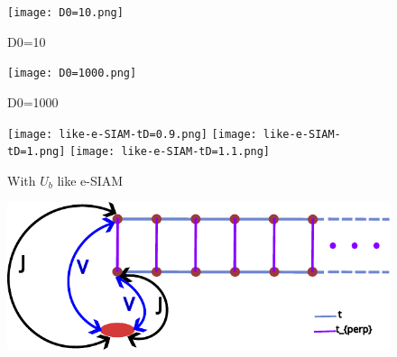 \documentclass[12pt]{article}
\begin{document}
\begin{figure}[!ht]
    \centering
    \texttt{[image: D0=10.png]}
    \caption{D0=10}
\end{figure}

\begin{figure}[!ht]
    \centering
    \texttt{[image: D0=1000.png]}
    \caption{D0=1000}
\end{figure}

\newpage



\begin{figure}[!ht]
    \centering
    \texttt{[image: like-e-SIAM-tD=0.9.png]}
    \texttt{[image: like-e-SIAM-tD=1.png]}
    \texttt{[image: like-e-SIAM-tD=1.1.png]}
    \caption{With $U_b$ like e-SIAM }
\end{figure}

\begin{figure}[!ht]
    \centering
    \includegraphics[scale=1.5]{3-orbital-figure.pdf}
\end{figure}
\end{document}
